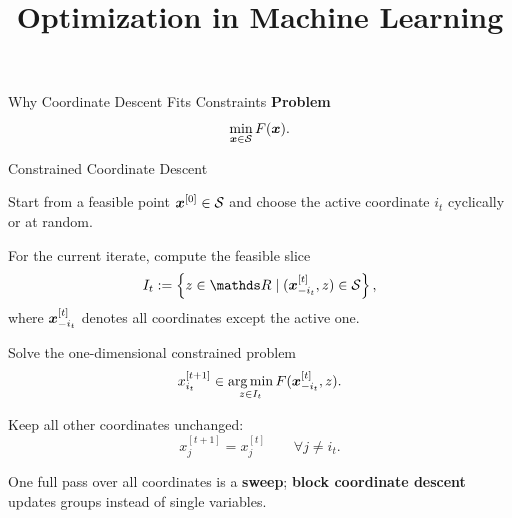 \documentclass[11pt,compress,t,notes=noshow, xcolor=table]{beamer}
\title{Optimization in Machine Learning}
\begin{document}

\begin{framev}[fs=small]{Why Coordinate Descent Fits Constraints}
\textbf{Problem}
$$
\min_{\bm{x} \in \mathcal{S}} F(\bm{x}).
$$
\vfill
{}
\end{framev}


\begin{framei}[fs=small]{Constrained Coordinate Descent}
\item Start from a feasible point $\bm{x}^{[0]} \in \mathcal{S}$ and choose the active coordinate $i_t$ cyclically or at random.
\item For the current iterate, compute the feasible slice
$$
I_t := \left\{ z \in \R \mid (\xv_{-i_t}^{[t]}, z) \in \S \right\},
$$
where $\bm{x}_{-i_t}^{[t]}$ denotes all coordinates except the active one.
\item Solve the one-dimensional constrained problem
$$
x_{i_t}^{[t+1]} \in \mathop{\mathrm{arg\,min}}_{z \in I_t} F(\bm{x}_{-i_t}^{[t]}, z).
$$
\item Keep all other coordinates unchanged:
$$
x_j^{[t+1]} = x_j^{[t]} \qquad \forall j \neq i_t.
$$
\item One full pass over all coordinates is a \textbf{sweep}; \textbf{block coordinate descent} updates groups instead of single variables.
\end{framei}
\end{document}
